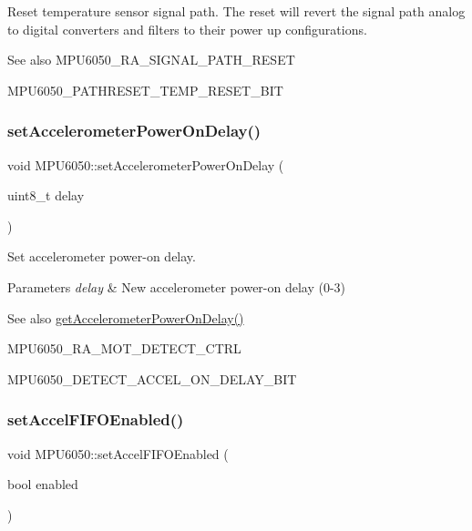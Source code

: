 Reset temperature sensor signal path. The reset will revert the signal path analog to digital converters and filters to their power up configurations. \begin{DoxySeeAlso}{See also}
M\+P\+U6050\+\_\+\+R\+A\+\_\+\+S\+I\+G\+N\+A\+L\+\_\+\+P\+A\+T\+H\+\_\+\+R\+E\+S\+ET 

M\+P\+U6050\+\_\+\+P\+A\+T\+H\+R\+E\+S\+E\+T\+\_\+\+T\+E\+M\+P\+\_\+\+R\+E\+S\+E\+T\+\_\+\+B\+IT 
\end{DoxySeeAlso}
\mbox{\label{class_m_p_u6050_a2bbde7653d2d2d37e16e515599f3b08b}} 
\subsubsection{\texorpdfstring{setAccelerometerPowerOnDelay()}{setAccelerometerPowerOnDelay()}}
{\footnotesize\ttfamily void M\+P\+U6050\+::set\+Accelerometer\+Power\+On\+Delay (\begin{DoxyParamCaption}\item[{uint8\+\_\+t}]{delay }\end{DoxyParamCaption})}

Set accelerometer power-\/on delay. 
\begin{DoxyParams}{Parameters}
{\em delay} & New accelerometer power-\/on delay (0-\/3) \\
\hline
\end{DoxyParams}
\begin{DoxySeeAlso}{See also}
\mbox{\hyperlink{class_m_p_u6050_aae903df2accc687423f9cd0a78f9cd32}{get\+Accelerometer\+Power\+On\+Delay()}} 

M\+P\+U6050\+\_\+\+R\+A\+\_\+\+M\+O\+T\+\_\+\+D\+E\+T\+E\+C\+T\+\_\+\+C\+T\+RL 

M\+P\+U6050\+\_\+\+D\+E\+T\+E\+C\+T\+\_\+\+A\+C\+C\+E\+L\+\_\+\+O\+N\+\_\+\+D\+E\+L\+A\+Y\+\_\+\+B\+IT 
\end{DoxySeeAlso}
\mbox{\label{class_m_p_u6050_afccbee85f5cdc95098f6d62d8d417c3f}} 
\subsubsection{\texorpdfstring{setAccelFIFOEnabled()}{setAccelFIFOEnabled()}}
{\footnotesize\ttfamily void M\+P\+U6050\+::set\+Accel\+F\+I\+F\+O\+Enabled (\begin{DoxyParamCaption}\item[{bool}]{enabled }\end{DoxyParamCaption})}

